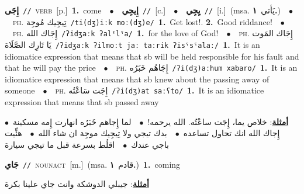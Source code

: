 \documentclass[10pt,a4paper,twoside]{article} %
\begin{document}
\begin{multicols}{2}
{\setlength\topsep{0pt}\textbf{\foreignlanguage{arabic}{إِجَى}}\ {\color{gray}\texttt{//}\color{black}}\ \textsc{verb}\ [p.]\ \textbf{1.}~come\ \ $\bullet$\ \ \setlength\topsep{0pt}\textbf{\foreignlanguage{arabic}{إِيجِي}}\ {\color{gray}\texttt{//}\color{black}}\ [c.]\ \ $\bullet$\ \ \setlength\topsep{0pt}\textbf{\foreignlanguage{arabic}{يِجِي}}\ {\color{gray}\texttt{//}\color{black}}\ [i.]\ \color{gray}(msa. \foreignlanguage{arabic}{يَأتي}~\foreignlanguage{arabic}{\textbf{١.}})\color{black}\ \ $\bullet$\ \ \textsc{ph.} \color{gray} \foreignlanguage{arabic}{تِيجِيك مُوجِة}\color{black}\ {\color{gray}\texttt{/{\sffamily ti(dʒ)iːk moː(dʒ)e}/}\color{black}}\ \textbf{1.}~Get lost!.  \textbf{2.}~Good riddance!\ \ $\bullet$\ \ \textsc{ph.} \color{gray} \foreignlanguage{arabic}{إِجَاك الله}\color{black}\ {\color{gray}\texttt{/{\sffamily ʔidʒaːk ʔalˤlˤa}/}\color{black}}\ \textbf{1.}~for the love of God!\ \ $\bullet$\ \ \textsc{ph.} \color{gray} \foreignlanguage{arabic}{إِجَاك المَوت يَا تَارِك الصَّلَاة}\color{black}\ {\color{gray}\texttt{/{\sffamily ʔidʒaːk ʔilmoːt jaː taːrik ʔisˤsˤalaː}/}\color{black}}\ \textbf{1.}~It is an idiomatice expression that means that sb will be held responsible for his fault and that he will pay the price\ \ $\bullet$\ \ \textsc{ph.} \color{gray} \foreignlanguage{arabic}{إِجَاهُم خَبَرُه}\color{black}\ {\color{gray}\texttt{/{\sffamily ʔi(dʒ)aːhum xabaro}/}\color{black}}\ \textbf{1.}~It is an idiomatice expression that means that sb knew about the passing away of someone\ \ $\bullet$\ \ \textsc{ph.} \color{gray} \foreignlanguage{arabic}{إِجَت سَاعْتُه}\color{black}\ {\color{gray}\texttt{/{\sffamily ʔi(dʒ)at saːʕto}/}\color{black}}\ \textbf{1.}~It is an idiomatice expression that means that sb passed away\  \begin{flushright}\color{gray}\foreignlanguage{arabic}{\textbf{\underline{\foreignlanguage{arabic}{أمثلة}}}: خلاص يما، إِجَت ساعْتُه. الله يرحمه!\ $\bullet$\ \  لما إِجاهم خَبَرُه انهارت إِمه مسكينة\ $\bullet$\ \  إِجاك الله انك تحاول تساعده\ $\bullet$\ \  بدك تيجي ولا تِيجِيك موجِة ان شاء الله\ $\bullet$\ \  هئِّيت باجي عندك\ $\bullet$\ \  اقلُط بسرعة قبل ما تيجي سيارة}\end{flushright}\color{black}} \vspace{2mm}

{\setlength\topsep{0pt}\textbf{\foreignlanguage{arabic}{جَاي}}\ {\color{gray}\texttt{//}\color{black}}\ \textsc{noun\textunderscore act}\ [m.]\ \color{gray}(msa. \foreignlanguage{arabic}{قادم}~\foreignlanguage{arabic}{\textbf{١.}})\color{black}\ \textbf{1.}~coming\  \begin{flushright}\color{gray}\foreignlanguage{arabic}{\textbf{\underline{\foreignlanguage{arabic}{أمثلة}}}: جيبلي الدوشكة وانت جاي علينا بكرة}\end{flushright}\color{black}} \vspace{2mm}


\end{multicols}
\end{document}
